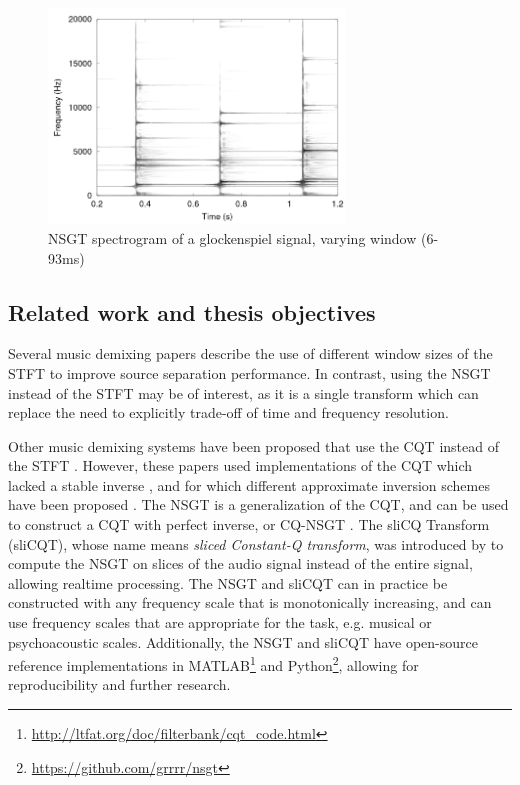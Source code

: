 \documentclass[report.tex]{subfiles}
\begin{document}
\begin{figure}[ht]
	\centering
	\includegraphics[width=0.7\textwidth]{./images-tftheory/tf_tradeoff_balasz3.png}
	\caption{NSGT spectrogram of a glockenspiel signal, varying window (6-93ms) \parencite[4]{jaillet}}
	\label{fig:nsgttradeoff}
\end{figure}

\subsection{Related work and thesis objectives}

Several music demixing papers \parencite{fitzgerald1, driedger, tftradeoff1, tftradeoff2} describe the use of different window sizes of the STFT to improve source separation performance. In contrast, using the NSGT instead of the STFT may be of interest, as it is a single transform which can replace the need to explicitly trade-off of time and frequency resolution.

Other music demixing systems have been proposed that use the CQT instead of the STFT \parencite{fitzgerald2, cqtseparation, bettermusicsep}. However, these papers used implementations of the CQT which lacked a stable inverse \parencite{lackinverse}, and for which different approximate inversion schemes have been proposed \parencite{klapuricqt, fitzgeraldcqt}. The NSGT is a generalization of the CQT, and can be used to construct a CQT with perfect inverse, or CQ-NSGT \parencite{invertiblecqt, variableq1}. The sliCQ Transform (sliCQT), whose name means \textit{sliced Constant-Q transform}, was introduced by \textcite{slicq} to compute the NSGT on slices of the audio signal instead of the entire signal, allowing realtime processing. The NSGT and sliCQT can in practice be constructed with any frequency scale that is monotonically increasing, and can use frequency scales that are appropriate for the task, e.g. musical or psychoacoustic scales. Additionally, the NSGT and sliCQT have open-source reference implementations in MATLAB\footnote{\url{http://ltfat.org/doc/filterbank/cqt_code.html}} and Python\footnote{\url{https://github.com/grrrr/nsgt}}, allowing for reproducibility and further research.
\end{document}
